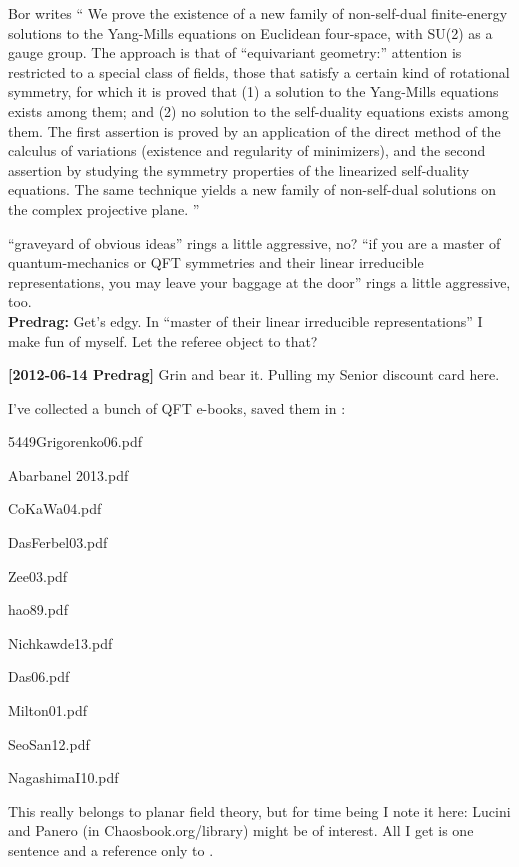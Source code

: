 \begin{description}

Bor writes
``
We prove the existence of a new family of non-self-dual finite-energy
solutions to the Yang-Mills equations on Euclidean four-space, with SU(2)
as a gauge group. The approach is that of ``equivariant geometry:''
attention is restricted to a special class of fields, those that satisfy
a certain kind of rotational symmetry, for which it is proved that (1) a
solution to the Yang-Mills equations exists among them; and (2) no
solution to the self-duality equations exists among them. The first
assertion is proved by an application of the direct method of the
calculus of variations (existence and regularity of minimizers), and the
second assertion by studying the symmetry properties of the linearized
self-duality equations. The same technique yields a new family of
non-self-dual solutions on the complex projective plane.
''

\item[2012-04-19 Daniel] ``graveyard of obvious ideas'' rings a little
    aggressive, no? ``if you are a master of quantum-mechanics or QFT symmetries
and their linear irreducible representations, you may leave your
baggage at the door'' rings a little aggressive, too.
\\{\bf Predrag:} Get's edgy. In ``master of their linear irreducible
    representations'' I make fun of myself. Let the referee object to
    that?


{\bf [2012-06-14 Predrag]} Grin and bear it. Pulling my Senior discount
card here.

\item[2013-07-15 Predrag] I've collected a bunch of QFT e-books, saved
them in :

5449Grigorenko06.pdf

Abarbanel 2013.pdf

CoKaWa04.pdf

DasFerbel03.pdf

Zee03.pdf

hao89.pdf

Nichkawde13.pdf

Das06.pdf

Milton01.pdf

SeoSan12.pdf

NagashimaI10.pdf


\item[2013-01-20  Predrag]
This really belongs to planar field theory, but for time being I note
it here: Lucini and Panero (in Chaosbook.org/library)
might be of interest. All I get is one sentence and a reference only
to .


\end{description}
